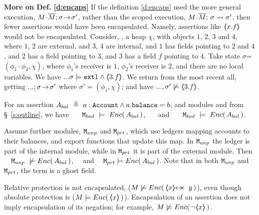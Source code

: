 \noindent
\textbf{More on Def. \ref{d:encaps}} {If the definition \ref{d:encaps} used the more general execution, $M\!\cdot\!\overline{M};\sigma\! \rightarrow\! {\sigma'}$, rather than the scoped execution,  $M\!\cdot\!\overline{M};\, {\sigma} \rightsquigarrow \sigma'$, then fewer assertions would have been encapsulated.}
Namely, assertions like    $\langle\!\!\langle x.f \rangle\!\!\rangle$ would not be encapsulated.
Consider, \eg, a heap $\chi$, with objects $1$, $2$, $3$ and $4$, where  $1$, $2$ are external, and $3$, $4$ are internal, and  $1$ has fields pointing to $2$ and $4$, and $2$ has a field pointing to $3$, and $3$ has a field $f$ pointing to $4$. Take  state $\sigma$=$(\phi_1\!\cdot\!\phi_2,\chi)$, where $\phi_1$'s receiver is $1$,  $\phi_2$'s receiver is $2$,   and there are no local variables. 
We have  $...\sigma\models \mbox{\normalfont{\texttt{extl}}} \wedge \langle\!\!\langle 3.f \rangle\!\!\rangle$. 
We  return from the most recent all, 
getting  $...;\sigma\! \rightarrow\! {\sigma'}$ where $\sigma'=(\phi_1,\chi)$; and have   $...,\sigma'\not\models  \langle\!\!\langle 3.f \rangle\!\!\rangle$.

\begin{example}
\label{ex:not:encaps}
For an assertion $A_{bal}\  \triangleq\ a:\prg{Account}\wedge a.\prg{balance}=b$, %
and modules \ModB and  \ModC  from \S~\ref{s:outline}, we have  \ \ \ $\mbox{\normalfont{\texttt{M}}}_{{bad}}\ \models\ {Enc(\,  A_{bal} \, )}$, \ \ \ and \ \ \ $\mbox{\normalfont{\texttt{M}}}_{{bad}}\ \models\ {Enc(\,  A_{bal} \, )}$.
\end{example}


\begin{example} Assume   further modules, $\mbox{\normalfont{\texttt{M}}}_{{unp}}$ and $\mbox{\normalfont{\texttt{M}}}_{{prt}}$,  which  use ledgers mapping  accounts to their balances, and export functions that update this map. In  $\mbox{\normalfont{\texttt{M}}}_{{unp}}$ the ledger is  part of the {internal} module, %
while in $\mbox{\normalfont{\texttt{M}}}_{{prt}}$ it is part of the  {external} module.
Then  \ \ $\ModD \ \not\models\encaps{ A_{bal}} $, \ \  and \ \ $\mbox{\normalfont{\texttt{M}}}_{{prt}}  \models {\ensuremath Enc(\,  A_{bal}\, )} $.
Note that in both $\mbox{\normalfont{\texttt{M}}}_{{unp}}$ and $\mbox{\normalfont{\texttt{M}}}_{{prt}}$, the term  is a ghost field. 
\end{example}

\begin{note} Relative protection %
is not encapsulated, (\eg $M \not\models {\encaps{\protectedFrom{x}{y}}}$), even though    absolute protection is
(\eg $M \models {\ensuremath Enc(\, \ensuremath{\langle\!\!\langle x \rangle\!\!\rangle}\, )}$).
Encapsulation of an assertion does not imply encapsulation of its negation; 
 for example,  $M \not\models {{\ensuremath Enc(\, \neg\ensuremath{\langle\!\!\langle x \rangle\!\!\rangle}\, )}}$.
\end{note}


